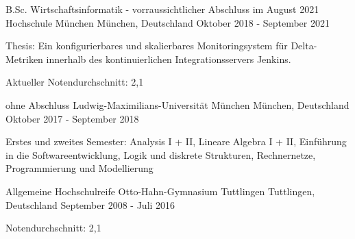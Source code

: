 

\begin{cventries}

   \cventry
    {B.Sc. Wirtschaftsinformatik - vorraussichtlicher Abschluss im August 2021} %
    {Hochschule München} %
    {München, Deutschland} %
    {Oktober 2018 - September 2021} %
    {
      \begin{cvitems} %
        \item {Thesis: Ein konfigurierbares und skalierbares Monitoringsystem für
Delta-Metriken innerhalb des kontinuierlichen Integrationsservers Jenkins.}
	\item {Aktueller Notendurchschnitt: 2,1}
      \end{cvitems}
    }
  
   \cventry
    {ohne Abschluss} %
    {Ludwig-Maximilians-Universität München} %
    {München, Deutschland} %
    {Oktober 2017 - September 2018} %
    {
      \begin{cvitems} %
        \item {Erstes und zweites Semester: Analysis I + II, Lineare Algebra I + II, Einführung in die Softwareentwicklung, Logik und diskrete Strukturen, Rechnernetze, Programmierung und Modellierung}
      \end{cvitems}
    }
   
    \cventry
    {Allgemeine Hochschulreife} %
    {Otto-Hahn-Gymnasium Tuttlingen} %
    {Tuttlingen, Deutschland} %
    {September 2008 - Juli 2016} %
    {
      \begin{cvitems} %
        \item {Notendurchschnitt: 2,1}
      \end{cvitems}
    }

\end{cventries}
